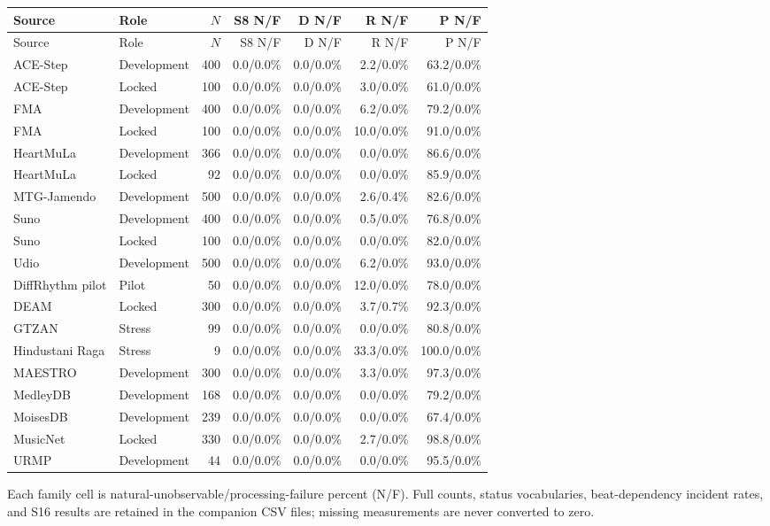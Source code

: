 \begin{longtable}{llrrrrr}
\toprule
Source & Role & $N$ & S8 N/F & D N/F & R N/F & P N/F \\
\midrule
\endfirsthead
\toprule
Source & Role & $N$ & S8 N/F & D N/F & R N/F & P N/F \\
\midrule
\endhead
ACE-Step & Development & 400 & 0.0/0.0\% & 0.0/0.0\% & 2.2/0.0\% & 63.2/0.0\% \\
ACE-Step & Locked & 100 & 0.0/0.0\% & 0.0/0.0\% & 3.0/0.0\% & 61.0/0.0\% \\
FMA & Development & 400 & 0.0/0.0\% & 0.0/0.0\% & 6.2/0.0\% & 79.2/0.0\% \\
FMA & Locked & 100 & 0.0/0.0\% & 0.0/0.0\% & 10.0/0.0\% & 91.0/0.0\% \\
HeartMuLa & Development & 366 & 0.0/0.0\% & 0.0/0.0\% & 0.0/0.0\% & 86.6/0.0\% \\
HeartMuLa & Locked & 92 & 0.0/0.0\% & 0.0/0.0\% & 0.0/0.0\% & 85.9/0.0\% \\
MTG-Jamendo & Development & 500 & 0.0/0.0\% & 0.0/0.0\% & 2.6/0.4\% & 82.6/0.0\% \\
Suno & Development & 400 & 0.0/0.0\% & 0.0/0.0\% & 0.5/0.0\% & 76.8/0.0\% \\
Suno & Locked & 100 & 0.0/0.0\% & 0.0/0.0\% & 0.0/0.0\% & 82.0/0.0\% \\
Udio & Development & 500 & 0.0/0.0\% & 0.0/0.0\% & 6.2/0.0\% & 93.0/0.0\% \\
DiffRhythm pilot & Pilot & 50 & 0.0/0.0\% & 0.0/0.0\% & 12.0/0.0\% & 78.0/0.0\% \\
DEAM & Locked & 300 & 0.0/0.0\% & 0.0/0.0\% & 3.7/0.7\% & 92.3/0.0\% \\
GTZAN & Stress & 99 & 0.0/0.0\% & 0.0/0.0\% & 0.0/0.0\% & 80.8/0.0\% \\
Hindustani Raga & Stress & 9 & 0.0/0.0\% & 0.0/0.0\% & 33.3/0.0\% & 100.0/0.0\% \\
MAESTRO & Development & 300 & 0.0/0.0\% & 0.0/0.0\% & 3.3/0.0\% & 97.3/0.0\% \\
MedleyDB & Development & 168 & 0.0/0.0\% & 0.0/0.0\% & 0.0/0.0\% & 79.2/0.0\% \\
MoisesDB & Development & 239 & 0.0/0.0\% & 0.0/0.0\% & 0.0/0.0\% & 67.4/0.0\% \\
MusicNet & Locked & 330 & 0.0/0.0\% & 0.0/0.0\% & 2.7/0.0\% & 98.8/0.0\% \\
URMP & Development & 44 & 0.0/0.0\% & 0.0/0.0\% & 0.0/0.0\% & 95.5/0.0\% \\
\bottomrule
\end{longtable}
{\footnotesize Each family cell is natural-unobservable/processing-failure percent (N/F). Full counts, status vocabularies, beat-dependency incident rates, and S16 results are retained in the companion CSV files; missing measurements are never converted to zero.}
